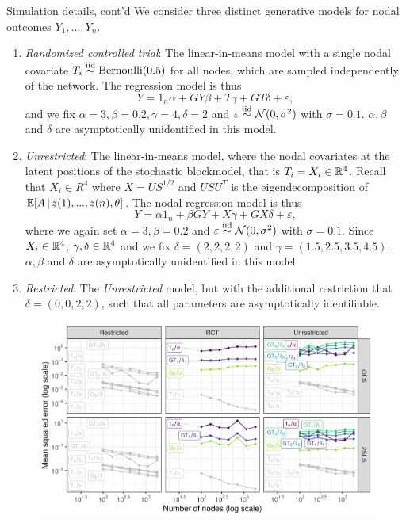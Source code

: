 \documentclass[aspectratio=169]{beamer}
\theoremstyle{remark}
\begin{document}
\begin{frame}{Simulation details, cont'd}
    We consider three distinct generative models for nodal outcomes $Y_1, ..., Y_n$.
    \begin{enumerate}
        \item \emph{Randomized controlled trial}: The linear-in-means model with a single nodal covariate $T_i \stackrel{\mathrm{iid}}{\sim} \operatorname*{Bernoulli}(0.5)$ for all nodes, which are sampled independently of the network. The regression model is thus
              \begin{equation*}
                  Y = 1_n \alpha + G Y \beta + T \gamma + G T \delta + \varepsilon,
              \end{equation*}
              and we fix $\alpha = 3, \beta = 0.2, \gamma = 4, \delta = 2$ and $\varepsilon \stackrel{\mathrm{iid}}{\sim} \mathcal{N}(0, \sigma^2)$ with $\sigma = 0.1$. $\alpha, \beta$ and $\delta$ are asymptotically unidentified in this model.
        \item \emph{Unrestricted}: The linear-in-means model, where the nodal covariates at the latent positions of the stochastic blockmodel, that is $T_i = X_i \in \mathbb{R}^4$. Recall that $X_i \in R^4$ where $X = U S^{1/2}$ and $U S U^T$ is the eigendecomposition of $\E[z(1), ..., z(n), \theta]{A}$. The nodal regression model is thus
              \begin{equation*}
                  Y = \alpha 1_n + \beta G Y + X \gamma + G X \delta + \varepsilon,
              \end{equation*}
              where we again set $\alpha = 3, \beta = 0.2$ and $\varepsilon \stackrel{\mathrm{iid}}{\sim} \mathcal{N}(0, \sigma^2)$ with $\sigma = 0.1$. Since $X_i \in \mathbb{R}^4$, $\gamma, \delta \in \mathbb{R}^4$ and we fix $\delta = (2, 2, 2, 2)$ and $\gamma = (1.5, 2.5, 3.5, 4.5)$. $\alpha, \beta$ and $\delta$ are asymptotically unidentified in this model.
        \item \emph{Restricted}: The \emph{Unrestricted} model, but with the additional restriction that $\delta = (0, 0, 2, 2)$, such that all parameters are asymptotically identifiable.
    \end{enumerate}
    
\end{frame}

\begin{frame}
    \begin{figure}
        \centering
        \includegraphics[width=\textwidth]{figures/simulations/mse.pdf}
    \end{figure}
\end{frame}
\end{document}
